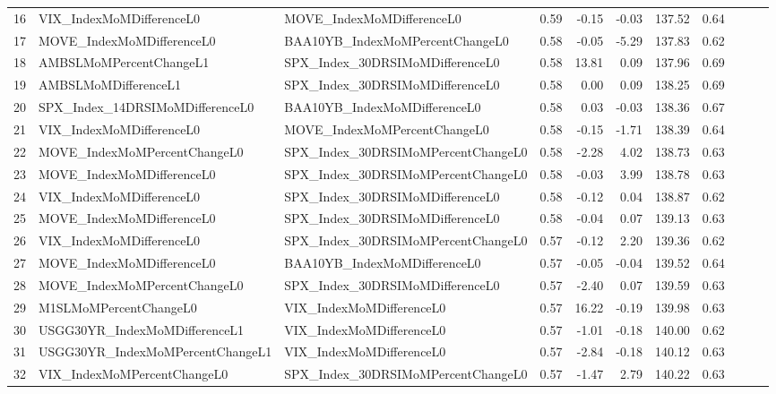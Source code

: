 \begin{longtable}{rllrrrrrlll}
  16 & VIX\_IndexMoMDifferenceL0 & MOVE\_IndexMoMDifferenceL0 & 0.59 & -0.15 & -0.03 & 137.52 & 0.64 &  &  &  \\ 
  17 & MOVE\_IndexMoMDifferenceL0 & BAA10YB\_IndexMoMPercentChangeL0 & 0.58 & -0.05 & -5.29 & 137.83 & 0.62 &  &  &  \\ 
  18 & AMBSLMoMPercentChangeL1 & SPX\_Index\_30DRSIMoMDifferenceL0 & 0.58 & 13.81 & 0.09 & 137.96 & 0.69 &  &  &  \\ 
  19 & AMBSLMoMDifferenceL1 & SPX\_Index\_30DRSIMoMDifferenceL0 & 0.58 & 0.00 & 0.09 & 138.25 & 0.69 &  &  &  \\ 
  20 & SPX\_Index\_14DRSIMoMDifferenceL0 & BAA10YB\_IndexMoMDifferenceL0 & 0.58 & 0.03 & -0.03 & 138.36 & 0.67 &  &  &  \\ 
  21 & VIX\_IndexMoMDifferenceL0 & MOVE\_IndexMoMPercentChangeL0 & 0.58 & -0.15 & -1.71 & 138.39 & 0.64 &  &  &  \\ 
  22 & MOVE\_IndexMoMPercentChangeL0 & SPX\_Index\_30DRSIMoMPercentChangeL0 & 0.58 & -2.28 & 4.02 & 138.73 & 0.63 &  &  &  \\ 
  23 & MOVE\_IndexMoMDifferenceL0 & SPX\_Index\_30DRSIMoMPercentChangeL0 & 0.58 & -0.03 & 3.99 & 138.78 & 0.63 &  &  &  \\ 
  24 & VIX\_IndexMoMDifferenceL0 & SPX\_Index\_30DRSIMoMDifferenceL0 & 0.58 & -0.12 & 0.04 & 138.87 & 0.62 &  &  &  \\ 
  25 & MOVE\_IndexMoMDifferenceL0 & SPX\_Index\_30DRSIMoMDifferenceL0 & 0.58 & -0.04 & 0.07 & 139.13 & 0.63 &  &  &  \\ 
  26 & VIX\_IndexMoMDifferenceL0 & SPX\_Index\_30DRSIMoMPercentChangeL0 & 0.57 & -0.12 & 2.20 & 139.36 & 0.62 &  &  &  \\ 
  27 & MOVE\_IndexMoMDifferenceL0 & BAA10YB\_IndexMoMDifferenceL0 & 0.57 & -0.05 & -0.04 & 139.52 & 0.64 &  &  &  \\ 
  28 & MOVE\_IndexMoMPercentChangeL0 & SPX\_Index\_30DRSIMoMDifferenceL0 & 0.57 & -2.40 & 0.07 & 139.59 & 0.63 &  &  &  \\ 
  29 & M1SLMoMPercentChangeL0 & VIX\_IndexMoMDifferenceL0 & 0.57 & 16.22 & -0.19 & 139.98 & 0.63 &  &  &  \\ 
  30 & USGG30YR\_IndexMoMDifferenceL1 & VIX\_IndexMoMDifferenceL0 & 0.57 & -1.01 & -0.18 & 140.00 & 0.62 &  &  &  \\ 
  31 & USGG30YR\_IndexMoMPercentChangeL1 & VIX\_IndexMoMDifferenceL0 & 0.57 & -2.84 & -0.18 & 140.12 & 0.63 &  &  &  \\ 
  32 & VIX\_IndexMoMPercentChangeL0 & SPX\_Index\_30DRSIMoMPercentChangeL0 & 0.57 & -1.47 & 2.79 & 140.22 & 0.63 &  &  &  \\ 

\end{longtable}
